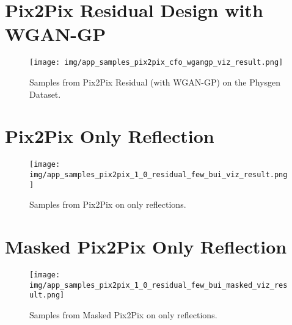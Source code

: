 	\section{Pix2Pix Residual Design with WGAN-GP}
	
		\begin{figure}[H]
			\centering
			\texttt{[image: img/app\_samples\_pix2pix\_cfo\_wgangp\_viz\_result.png]}
			\caption[Samples from Pix2Pix (with WGAN-GP) Residual on the Physgen Dataset.]{Samples from Pix2Pix Residual (with WGAN-GP) on the Physgen Dataset.}
		\end{figure}
		\FloatBarrier
	
	\section{Pix2Pix Only Reflection}
	
		\begin{figure}[H]
			\centering
			\texttt{[image: img/app\_samples\_pix2pix\_1\_0\_residual\_few\_bui\_viz\_result.png]}
			\caption[Samples from Pix2Pix on only reflections.]{Samples from Pix2Pix on only reflections.}
		\end{figure}
		\FloatBarrier
		
	\section{Masked Pix2Pix Only Reflection}
	
		\begin{figure}[H]
			\centering
			\texttt{[image: img/app\_samples\_pix2pix\_1\_0\_residual\_few\_bui\_masked\_viz\_result.png]}
			\caption[Samples from Masked Pix2Pix on only reflections.]{Samples from Masked Pix2Pix on only reflections.}
		\end{figure}
		\FloatBarrier
















